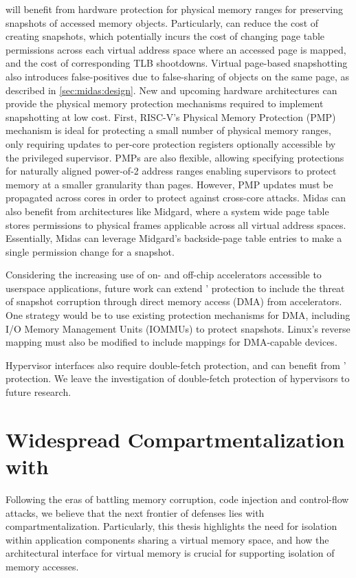 \midas will benefit from hardware protection for physical memory
ranges for preserving snapshots of accessed memory objects.
Particularly, \midas can reduce the cost of creating snapshots, 
which potentially incurs the cost of changing page table 
permissions across each virtual address space where an accessed page
is mapped, and the cost of corresponding TLB shootdowns.
Virtual page-based snapshotting also introduces false-positives due to
false-sharing of objects on the same page, as described in 
\autoref{sec:midas:design}.
New and upcoming hardware architectures can provide the physical
memory protection mechanisms required to implement snapshotting at low cost.
First, RISC-V's Physical Memory Protection (PMP) mechanism is ideal for
protecting a small number of physical memory ranges, only requiring updates
to per-core protection registers optionally accessible by the privileged
supervisor. 
PMPs are also flexible, allowing specifying protections for naturally aligned
power-of-2 address ranges enabling supervisors to protect memory at a
smaller granularity than pages.
However, PMP updates must be propagated across cores in order to protect
against cross-core attacks.
Midas can also benefit from architectures like Midgard, where a system wide
page table stores permissions to physical frames applicable across all
virtual address spaces.
Essentially, Midas can leverage Midgard's backside-page table entries to
make a single permission change for a snapshot.

Considering the increasing use of on- and off-chip accelerators accessible to
userspace applications, future work can extend \midas' protection to include
the threat of snapshot corruption through direct memory access (DMA)
from accelerators.
One strategy would be to use existing protection mechanisms for DMA, including
I/O Memory Management Units (IOMMUs) to protect snapshots.
Linux's reverse mapping must also be modified to include mappings for 
DMA-capable devices.

Hypervisor interfaces also require double-fetch protection, and can benefit 
from \midas' protection.
We leave the investigation of double-fetch protection of hypervisors to future
research.

\section{Widespread Compartmentalization with \seccells}
\label{sec:conclusion:seccells}
Following the eras of battling memory corruption, code injection and 
control-flow attacks,
we believe that the next frontier of defenses lies with compartmentalization.
Particularly, this thesis highlights the need for isolation within
application components sharing a virtual memory space, and how the
architectural interface for virtual memory is crucial for supporting
isolation of memory accesses.

